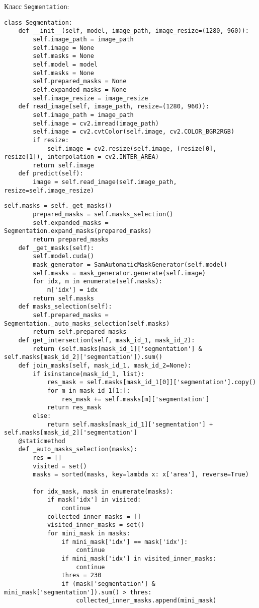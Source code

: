 Класс \lstinline{Segmentation}:

\begin{lstlisting}[basicstyle=\ttfamily\small]
class Segmentation:
    def __init__(self, model, image_path, image_resize=(1280, 960)):
        self.image_path = image_path
        self.image = None
        self.masks = None
        self.model = model
        self.masks = None
        self.prepared_masks = None
        self.expanded_masks = None
        self.image_resize = image_resize
    def read_image(self, image_path, resize=(1280, 960)):
        self.image_path = image_path
        self.image = cv2.imread(image_path)
        self.image = cv2.cvtColor(self.image, cv2.COLOR_BGR2RGB)
        if resize:
            self.image = cv2.resize(self.image, (resize[0], resize[1]), interpolation = cv2.INTER_AREA)
        return self.image
    def predict(self):
        image = self.read_image(self.image_path, resize=self.image_resize)
                \end{lstlisting}
\begin{lstlisting}[basicstyle=\ttfamily\small]
        self.masks = self._get_masks()
        prepared_masks = self.masks_selection()
        self.expanded_masks = Segmentation.expand_masks(prepared_masks)
        return prepared_masks
    def _get_masks(self):
        self.model.cuda()
        mask_generator = SamAutomaticMaskGenerator(self.model)
        self.masks = mask_generator.generate(self.image)
        for idx, m in enumerate(self.masks):
            m['idx'] = idx
        return self.masks
    def masks_selection(self):
        self.prepared_masks = Segmentation._auto_masks_selection(self.masks)
        return self.prepared_masks
    def get_intersection(self, mask_id_1, mask_id_2):
        return (self.masks[mask_id_1]['segmentation'] & self.masks[mask_id_2]['segmentation']).sum()
    def join_masks(self, mask_id_1, mask_id_2=None):
        if isinstance(mask_id_1, list):
            res_mask = self.masks[mask_id_1[0]]['segmentation'].copy()
            for m in mask_id_1[1:]:
                res_mask += self.masks[m]['segmentation']
            return res_mask
        else:
            return self.masks[mask_id_1]['segmentation'] + self.masks[mask_id_2]['segmentation']
    @staticmethod
    def _auto_masks_selection(masks):
        res = []
        visited = set()
        masks = sorted(masks, key=lambda x: x['area'], reverse=True)

        for idx_mask, mask in enumerate(masks):
            if mask['idx'] in visited:
                continue
            collected_inner_masks = []
            visited_inner_masks = set()
            for mini_mask in masks:
                if mini_mask['idx'] == mask['idx']:
                    continue
                if mini_mask['idx'] in visited_inner_masks:
                    continue
                thres = 230
                if (mask['segmentation'] & mini_mask['segmentation']).sum() > thres:
                    collected_inner_masks.append(mini_mask)
                            \end{lstlisting}
